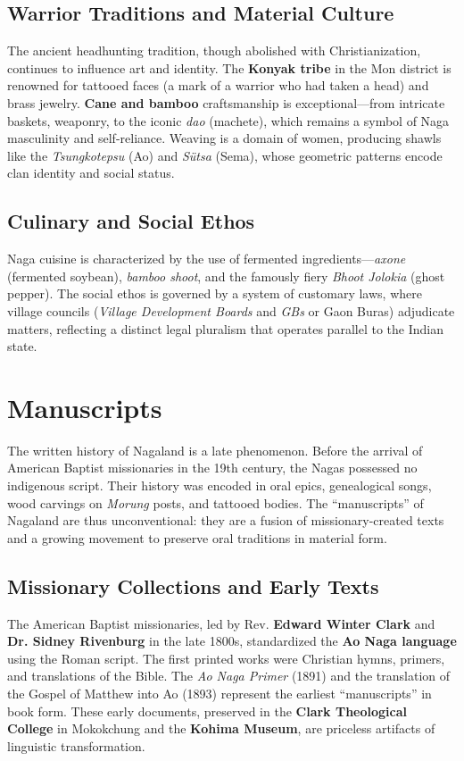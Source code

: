 \documentclass{article}
\begin{document}
\subsection{Warrior Traditions and Material Culture}
The ancient headhunting tradition, though abolished with Christianization, continues to influence art and identity. The \textbf{Konyak tribe} in the Mon district is renowned for tattooed faces (a mark of a warrior who had taken a head) and brass jewelry. \textbf{Cane and bamboo} craftsmanship is exceptional—from intricate baskets, weaponry, to the iconic \textit{dao} (machete), which remains a symbol of Naga masculinity and self-reliance. Weaving is a domain of women, producing shawls like the \textit{Tsungkotepsu} (Ao) and \textit{Sütsa} (Sema), whose geometric patterns encode clan identity and social status.

\subsection{Culinary and Social Ethos}
Naga cuisine is characterized by the use of fermented ingredients—\textit{axone} (fermented soybean), \textit{bamboo shoot}, and the famously fiery \textit{Bhoot Jolokia} (ghost pepper). The social ethos is governed by a system of customary laws, where village councils (\textit{Village Development Boards} and \textit{GBs} or Gaon Buras) adjudicate matters, reflecting a distinct legal pluralism that operates parallel to the Indian state.

\section{Manuscripts}
The written history of Nagaland is a late phenomenon. Before the arrival of American Baptist missionaries in the 19th century, the Nagas possessed no indigenous script. Their history was encoded in oral epics, genealogical songs, wood carvings on \textit{Morung} posts, and tattooed bodies. The ``manuscripts'' of Nagaland are thus unconventional: they are a fusion of missionary-created texts and a growing movement to preserve oral traditions in material form.

\subsection{Missionary Collections and Early Texts}
The American Baptist missionaries, led by Rev. \textbf{Edward Winter Clark} and \textbf{Dr. Sidney Rivenburg} in the late 1800s, standardized the \textbf{Ao Naga language} using the Roman script. The first printed works were Christian hymns, primers, and translations of the Bible. The \textit{Ao Naga Primer} (1891) and the translation of the Gospel of Matthew into Ao (1893) represent the earliest ``manuscripts'' in book form. These early documents, preserved in the \textbf{Clark Theological College} in Mokokchung and the \textbf{Kohima Museum}, are priceless artifacts of linguistic transformation.
\end{document}
